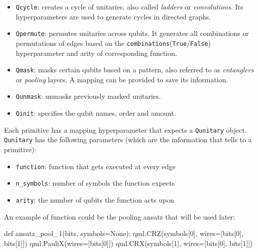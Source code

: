 \documentclass[
  13pt,
  a4paper,
  DIV=11,
  numbers=noendperiod]{scrreprt}
\newenvironment{Shaded}{\begin{snugshade}}{\end{snugshade}}
\newcommand{\DecValTok}[1]{\textcolor[rgb]{0.68,0.00,0.00}{#1}}
\newcommand{\KeywordTok}[1]{\textcolor[rgb]{0.00,0.23,0.31}{#1}}
\newcommand{\NormalTok}[1]{\textcolor[rgb]{0.00,0.23,0.31}{#1}}
\newcommand{\OperatorTok}[1]{\textcolor[rgb]{0.37,0.37,0.37}{#1}}
\newcommand{\VariableTok}[1]{\textcolor[rgb]{0.07,0.07,0.07}{#1}}
\providecommand{\tightlist}{%
  \setlength{\itemsep}{0pt}\setlength{\parskip}{0pt}}\usepackage{longtable,booktabs,array}
\begin{document}
\begin{itemize}
\item
  \texttt{Qcycle}: creates a cycle of unitaries, also called
  \emph{ladders} or \emph{convolutions}. Its hyperparameters are used to
  generate cycles in directed graphs.
\item
  \texttt{Qpermute}: permutes unitaries across qubits. It generates all
  combinations or permutations of edges based on the
  \texttt{combinations}(\texttt{True}/\texttt{False}) hyperparameter and
  arity of corresponding function.
\item
  \texttt{Qmask}: masks certain qubits based on a pattern, also referred
  to as \emph{entanglers} or \emph{pooling} layers. A mapping can be
  provided to save its information.
\item
  \texttt{Qunmask}: unmasks previously masked unitaries.
\item
  \texttt{Qinit}: specifies the qubit names, order and amount.
\end{itemize}

Each primitive has a mapping hyperparameter that expects a
\texttt{Qunitary} object. \texttt{Qunitary} has the following parameters
(which are the information that tells to a primitive):

\begin{itemize}
\tightlist
\item
  \texttt{function}: function that gets executed at every edge
\item
  \texttt{n\_symbols}: number of symbols the function expects
\item
  \texttt{arity}: the number of qubits the function acts upon
\end{itemize}

An example of function could be the pooling ansatz that will be used
later:

\begin{Shaded}
\begin{Highlighting}[]
\KeywordTok{def}\NormalTok{ ansatz\_pool\_1(bits, symbols}\OperatorTok{=}\VariableTok{None}\NormalTok{):}
\NormalTok{  qml.CRZ(symbols[}\DecValTok{0}\NormalTok{], wires}\OperatorTok{=}\NormalTok{[bits[}\DecValTok{0}\NormalTok{], bits[}\DecValTok{1}\NormalTok{]])}
\NormalTok{  qml.PauliX(wires}\OperatorTok{=}\NormalTok{[bits[}\DecValTok{0}\NormalTok{]])}
\NormalTok{  qml.CRX(symbols[}\DecValTok{1}\NormalTok{], wires}\OperatorTok{=}\NormalTok{[bits[}\DecValTok{0}\NormalTok{], bits[}\DecValTok{1}\NormalTok{]])}
\end{Highlighting}
\end{Shaded}
\end{document}
